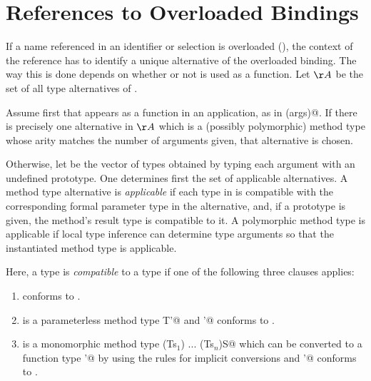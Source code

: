 \documentclass[11pt]{report}
\begin{document}
\section{References to Overloaded Bindings}
\label{sec:overloaded-refs}

If a name \verb@f@ referenced in an identifier or selection is
overloaded (), the context of the reference
has to identify a unique alternative of the overloaded binding. The
way this is done depends on whether or not \verb@f@ is used as a
function.  Let $\AA$ be the set of all type alternatives of
\verb@f@.

Assume first that \verb@f@ appears as a function in an application, as
in \verb@f(args)@.  If there is precisely one alternative in
$\AA$ which is a (possibly polymorphic) method type whose arity
matches the number of arguments given, that alternative is chosen.

Otherwise, let \verb@argtypes@ be the vector of types obtained by
typing each argument with an undefined prototype. One determines first
the set of applicable alternatives. A method type alternative is {\em
applicable} if each type in \verb@argtypes@ is compatible with the
corresponding formal parameter type in the alternative, and, if a
prototype is given, the method's result type is compatible to it.  A
polymorphic method type is applicable if local type inference can
determine type arguments so that the instantiated method type is
applicable.

Here, a type \verb@T@ is {\em compatible} to a type \verb@U@ if one of the
following three clauses applies:
\begin{enumerate}
\item
\verb@T@ conforms to \verb@U@.
\item
\verb@T@ is a parameterless method type \verb@[]T'@ and \verb@T'@
conforms to \verb@U@.
\item 
\verb@T@ is a monomorphic method type \verb@(Ts$_1$) ... (Ts$_n$)S@ which
can be converted to a function type \verb@T'@ by using the rules for
implicit conversions  and \verb@T'@ conforms to
\verb@U@.
\end{enumerate}
\end{document}
